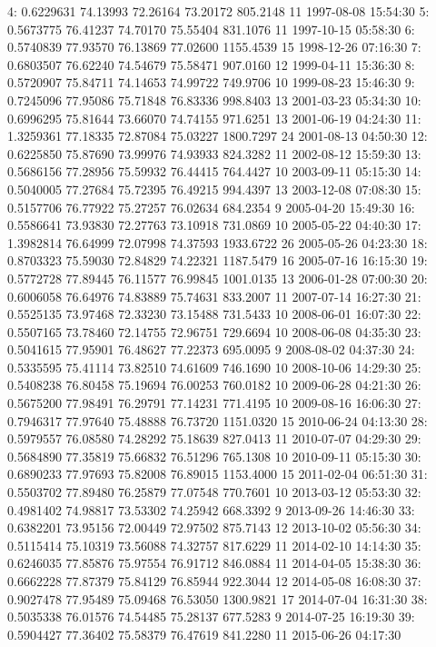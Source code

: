 \documentclass[
  10pt,
  a4paper,oneside]{article}
\begin{document}
4: 0.6229631 74.13993 72.26164 73.20172 805.2148 11 1997-08-08 15:54:30
5: 0.5673775 76.41237 74.70170 75.55404 831.1076 11 1997-10-15 05:58:30
6: 0.5740839 77.93570 76.13869 77.02600 1155.4539 15 1998-12-26 07:16:30
7: 0.6803507 76.62240 74.54679 75.58471 907.0160 12 1999-04-11 15:36:30
8: 0.5720907 75.84711 74.14653 74.99722 749.9706 10 1999-08-23 15:46:30
9: 0.7245096 77.95086 75.71848 76.83336 998.8403 13 2001-03-23 05:34:30
10: 0.6996295 75.81644 73.66070 74.74155 971.6251 13 2001-06-19 04:24:30
11: 1.3259361 77.18335 72.87084 75.03227 1800.7297 24 2001-08-13 04:50:30
12: 0.6225850 75.87690 73.99976 74.93933 824.3282 11 2002-08-12 15:59:30
13: 0.5686156 77.28956 75.59932 76.44415 764.4427 10 2003-09-11 05:15:30
14: 0.5040005 77.27684 75.72395 76.49215 994.4397 13 2003-12-08 07:08:30
15: 0.5157706 76.77922 75.27257 76.02634 684.2354 9 2005-04-20 15:49:30
16: 0.5586641 73.93830 72.27763 73.10918 731.0869 10 2005-05-22 04:40:30
17: 1.3982814 76.64999 72.07998 74.37593 1933.6722 26 2005-05-26 04:23:30
18: 0.8703323 75.59030 72.84829 74.22321 1187.5479 16 2005-07-16 16:15:30
19: 0.5772728 77.89445 76.11577 76.99845 1001.0135 13 2006-01-28 07:00:30
20: 0.6006058 76.64976 74.83889 75.74631 833.2007 11 2007-07-14 16:27:30
21: 0.5525135 73.97468 72.33230 73.15488 731.5433 10 2008-06-01 16:07:30
22: 0.5507165 73.78460 72.14755 72.96751 729.6694 10 2008-06-08 04:35:30
23: 0.5041615 77.95901 76.48627 77.22373 695.0095 9 2008-08-02 04:37:30
24: 0.5335595 75.41114 73.82510 74.61609 746.1690 10 2008-10-06 14:29:30
25: 0.5408238 76.80458 75.19694 76.00253 760.0182 10 2009-06-28 04:21:30
26: 0.5675200 77.98491 76.29791 77.14231 771.4195 10 2009-08-16 16:06:30
27: 0.7946317 77.97640 75.48888 76.73720 1151.0320 15 2010-06-24 04:13:30
28: 0.5979557 76.08580 74.28292 75.18639 827.0413 11 2010-07-07 04:29:30
29: 0.5684890 77.35819 75.66832 76.51296 765.1308 10 2010-09-11 05:15:30
30: 0.6890233 77.97693 75.82008 76.89015 1153.4000 15 2011-02-04 06:51:30
31: 0.5503702 77.89480 76.25879 77.07548 770.7601 10 2013-03-12 05:53:30
32: 0.4981402 74.98817 73.53302 74.25942 668.3392 9 2013-09-26 14:46:30
33: 0.6382201 73.95156 72.00449 72.97502 875.7143 12 2013-10-02 05:56:30
34: 0.5115414 75.10319 73.56088 74.32757 817.6229 11 2014-02-10 14:14:30
35: 0.6246035 77.85876 75.97554 76.91712 846.0884 11 2014-04-05 15:38:30
36: 0.6662228 77.87379 75.84129 76.85944 922.3044 12 2014-05-08 16:08:30
37: 0.9027478 77.95489 75.09468 76.53050 1300.9821 17 2014-07-04 16:31:30
38: 0.5035338 76.01576 74.54485 75.28137 677.5283 9 2014-07-25 16:19:30
39: 0.5904427 77.36402 75.58379 76.47619 841.2280 11 2015-06-26 04:17:30
\end{document}
